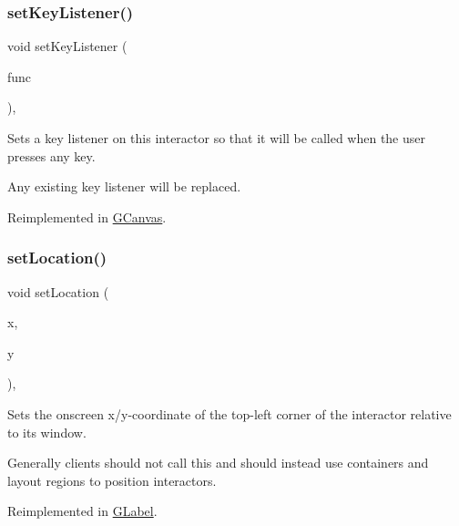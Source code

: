 \subsubsection{\texorpdfstring{set\+Key\+Listener()}{setKeyListener()}\hspace{0.1cm}{\footnotesize\ttfamily [2/2]}}
{\footnotesize\ttfamily void set\+Key\+Listener (\begin{DoxyParamCaption}\item[{\mbox{\hyperlink{namespacesgl_a54427ce97bb1c2804e4fe2b0a62e8b17}{G\+Event\+Listener\+Void}}}]{func }\end{DoxyParamCaption})\hspace{0.3cm}{\ttfamily [virtual]}, {\ttfamily [inherited]}}



Sets a key listener on this interactor so that it will be called when the user presses any key. 

Any existing key listener will be replaced. 

Reimplemented in \mbox{\hyperlink{classsgl_1_1GCanvas_a1320ed9889a730dfead04a334463ecf3}{G\+Canvas}}.

\mbox{\label{classsgl_1_1GInteractor_a04594e8ba9b98513a64f1da00dcae18c}} 
\subsubsection{\texorpdfstring{set\+Location()}{setLocation()}}
{\footnotesize\ttfamily void set\+Location (\begin{DoxyParamCaption}\item[{double}]{x,  }\item[{double}]{y }\end{DoxyParamCaption})\hspace{0.3cm}{\ttfamily [virtual]}, {\ttfamily [inherited]}}



Sets the onscreen x/y-\/coordinate of the top-\/left corner of the interactor relative to its window. 

Generally clients should not call this and should instead use containers and layout regions to position interactors. 

Reimplemented in \mbox{\hyperlink{classsgl_1_1GLabel_ae3b17c0aeb355dc23c4e4cbf066e81f7}{G\+Label}}.

